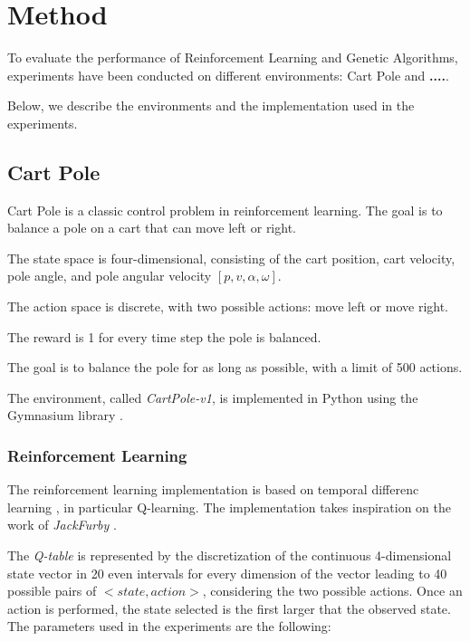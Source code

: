 \section{Method}
To evaluate the performance of Reinforcement Learning and Genetic Algorithms,
experiments have been conducted on different environments:
Cart Pole and \textbf{....}.

Below, we describe the environments and the implementation used in the experiments.
\subsection{Cart Pole}
Cart Pole is a classic control problem in reinforcement learning. 
The goal is to balance a pole on a cart that can move left or right. 

The state space is four-dimensional, consisting of the cart position, cart velocity, pole angle, and pole angular velocity $[p, v, \alpha, \omega]$. 

The action space is discrete, with two possible actions: move left or move right. 

The reward is 1 for every time step the pole is balanced.

The goal is to balance the pole for as long as possible, with a limit of 500 actions.

The environment, called \textit{CartPole-v1}, is implemented in Python using the Gymnasium library \cite{towers_gymnasium_2023}.

\subsubsection{Reinforcement Learning}
The reinforcement learning implementation is based on temporal differenc learning \cite{sutton1998temporal}, 
in particular Q-learning.
The implementation takes inspiration on the work of \textit{JackFurby} \cite{JackFurbyCartPole}.

The \textit{Q-table} is represented by the discretization of the continuous 4-dimensional state vector in 20 even intervals for every dimension of the vector leading to 40 possible pairs of $<state,action>$, considering the two possible actions.
Once an action is performed, the state selected is the first larger that the observed state.\\
The parameters used in the experiments are the following:


